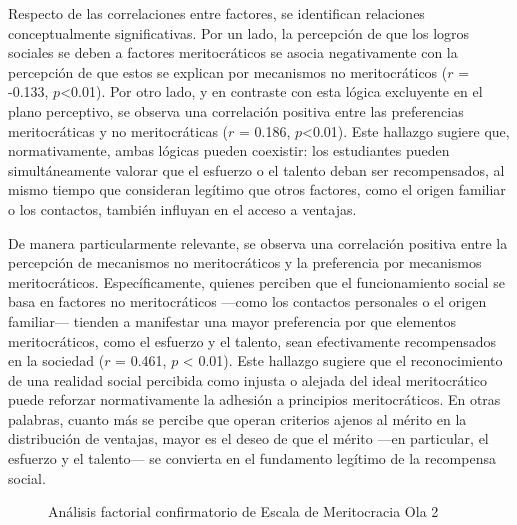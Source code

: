 \documentclass[
  12pt,
]{article}
\begin{document}
Respecto de las correlaciones entre factores, se identifican relaciones
conceptualmente significativas. Por un lado, la percepción de que los
logros sociales se deben a factores meritocráticos se asocia
negativamente con la percepción de que estos se explican por mecanismos
no meritocráticos (\(r\) = -0.133, \(p\)\textless0.01). Por otro lado, y
en contraste con esta lógica excluyente en el plano perceptivo, se
observa una correlación positiva entre las preferencias meritocráticas y
no meritocráticas (\(r\) = 0.186, \(p\)\textless0.01). Este hallazgo
sugiere que, normativamente, ambas lógicas pueden coexistir: los
estudiantes pueden simultáneamente valorar que el esfuerzo o el talento
deban ser recompensados, al mismo tiempo que consideran legítimo que
otros factores, como el origen familiar o los contactos, también
influyan en el acceso a ventajas.

De manera particularmente relevante, se observa una correlación positiva
entre la percepción de mecanismos no meritocráticos y la preferencia por
mecanismos meritocráticos. Específicamente, quienes perciben que el
funcionamiento social se basa en factores no meritocráticos ---como los
contactos personales o el origen familiar--- tienden a manifestar una
mayor preferencia por que elementos meritocráticos, como el esfuerzo y
el talento, sean efectivamente recompensados en la sociedad (\(r\) =
0.461, \(p\) \textless{} 0.01). Este hallazgo sugiere que el
reconocimiento de una realidad social percibida como injusta o alejada
del ideal meritocrático puede reforzar normativamente la adhesión a
principios meritocráticos. En otras palabras, cuanto más se percibe que
operan criterios ajenos al mérito en la distribución de ventajas, mayor
es el deseo de que el mérito ---en particular, el esfuerzo y el
talento--- se convierta en el fundamento legítimo de la recompensa
social.

\begin{figure}

\caption{\label{fig-cfa2}Análisis factorial confirmatorio de Escala de
Meritocracia Ola 2}


\end{figure}%
\end{document}
